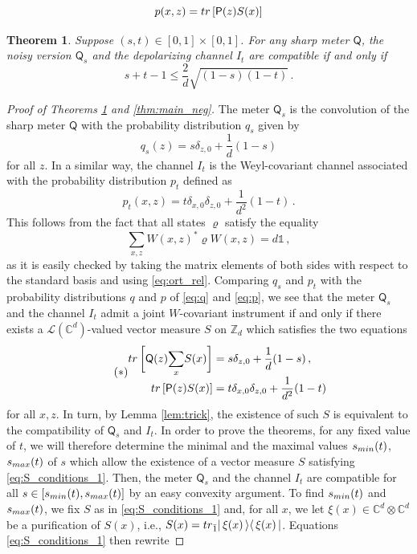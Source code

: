 \documentclass[10pt,a4paper]{amsart}
\newtheorem{theorem}{Theorem}
\newcommand{\Cb}{\mathbb{C}} %
\newcommand{\Po}{\mathsf{P}}%
\newcommand{\Qo}{\mathsf{Q}}%
\newcommand{\Zb}{\mathbb{Z}} %
\newcommand{\id}{\mathds{1}} %
\newcommand{\kb}[2]{\vert\,#1\,\rangle\langle\,#2\,\vert} %
\newcommand{\lc}[1]{\mathcal{L}(\Cb^{#1})} %
\newcommand{\ptr}[2]{{\rm tr}_{#1} #2} %
\newcommand{\rhoo}{\varrho} %
\newcommand{\tr}[1]{{\rm tr}\left[#1\right]} %
\begin{document}
\begin{equation}\label{eq:p}
p(x,z) = \tr{\Po(z)S(x)}
\end{equation}

\begin{theorem}\label{thm:main}
Suppose $(s,t)\in [0,1]\times [0,1]$. For any sharp meter $\Qo$, the noisy version $\Qo_s$ and the depolarizing channel $I_t$ are compatible if and only if
\begin{equation}\label{eq:QI_comp}
s+t-1\leq \frac{2}{d}\sqrt{(1-s)(1-t)}\, .
\end{equation}
\end{theorem}

\begin{proof}[Proof of Theorems \ref{thm:main} and \ref{thm:main_neg}]
The meter $\Qo_s$ is the convolution of the sharp meter $\Qo$ with the probability distribution $q_s$ given by
$$
q_s(z) = s\delta_{z,0} + \frac{1}{d}(1-s)
$$
for all $z$. In a similar way, the channel $I_t$ is the Weyl-covariant channel associated with the probability distribution $p_t$ defined as
$$
p_t(x,z) = t\delta_{x,0}\delta_{z,0} + \frac{1}{d^2}(1-t)\,.
$$
This follows from the fact that all states $\rhoo$ satisfy the equality
$$
\sum_{x,z} W(x,z)^*\rhoo W(x,z) = d\id\,,
$$
as it is easily checked by taking the matrix elements of both sides with respect to the standard basis and using \eqref{eq:ort_rel}. Comparing $q_s$ and $p_t$ with the probability distributions $q$ and $p$ of \eqref{eq:q} and \eqref{eq:p}, we see that the meter $\Qo_s$ and the channel $I_t$ admit a joint $W$-covariant instrument if and only if there exists a $\lc{d}$-valued vector measure $S$ on $\Zb_d$ which satisfies the two equations
\begin{equation}\tag{$\ast$}\label{eq:S_conditions_1}
\begin{aligned}
\tr{\vphantom{\bigg[}\Qo(z)\smash{\sum_x} S(x)} & = s\delta_{z,0} + \frac{1}{d}(1-s) \,,\\
\tr{\Po(z)S(x)} & = t\delta_{x,0}\delta_{z,0} + \frac{1}{d^2}(1-t)
\end{aligned}
\end{equation}
for all $x,z$. In turn, by Lemma \ref{lem:trick}, the existence of such $S$ is equivalent to the compatibility of $\Qo_s$ and $I_t$. In order to prove the theorems, for any fixed value of $t$, we will therefore determine the minimal and the maximal values $s_{\rm min}(t)$, $s_{\rm max}(t)$ of $s$ which allow the existence of a vector measure $S$ satisfying \eqref{eq:S_conditions_1}. Then, the  meter $\Qo_s$ and the channel $I_t$ are compatible for all $s\in [s_{\rm min}(t),s_{\rm max}(t)]$ by an easy convexity argument. To find $s_{\rm min}(t)$ and $s_{\rm max}(t)$, we fix $S$ as in \eqref{eq:S_conditions_1} and, for all $x$, we let $\xi(x)\in\Cb^d\otimes\Cb^d$ be a purification of $S(x)$, i.e., $S(x)=\ptr{\bar{1}}{\kb{\xi(x)}{\xi(x)}}$. Equations \eqref{eq:S_conditions_1} then rewrite

\end{proof}
\end{document}

